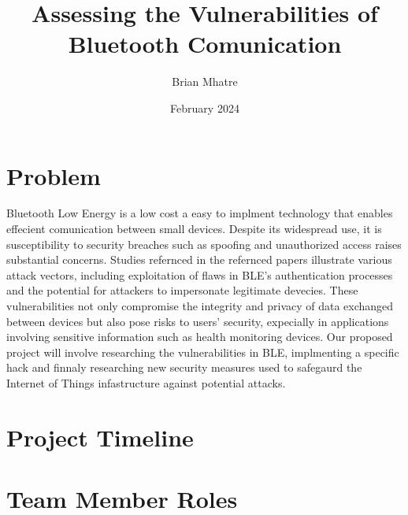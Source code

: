 \documentclass{article}
\title{Assessing the Vulnerabilities of Bluetooth Comunication}
\author{Brian Mhatre}
\date{February 2024}
\begin{document}
\maketitle

\section{Problem}
    Bluetooth Low Energy is a low cost a easy to implment technology that enables effecient
    comunication between small devices. Despite its widespread use, it is susceptibility to security breaches
    such as spoofing and unauthorized access raises substantial concerns. Studies refernced in the refernced papers illustrate various 
    attack vectors, including exploitation of flaws in BLE's authentication processes and the potential
    for attackers to impersonate legitimate devecies. These vulnerabilities not only compromise the integrity 
    and privacy of data exchanged between devices but also pose risks to users' security, expecially in applications involving
    sensitive information such as health monitoring devices. Our proposed project will involve researching the vulnerabilities in BLE,
    implmenting a specific hack and finnaly researching new security measures used to safegaurd the Internet of Things infastructure against
    potential attacks.
\section{Project Timeline}
\section{Team Member Roles}
\end{document}
